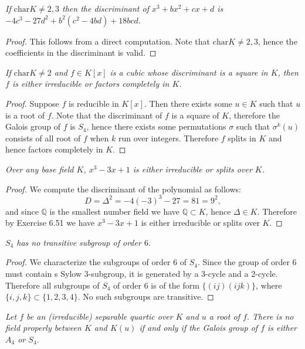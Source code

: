 \begin{problem}\em
If $\mathrm{char }K\neq 2, 3$ then the discriminant of $x^3+bx^2+cx+d$ is $-4c^3-27d^2+b^2(c^2-4bd)+18bcd$.
\end{problem}
\begin{proof}
This follows from a direct computation. Note that $\mathrm{char}K\ne 2,3$, hence the coefficients in the discriminant is valid.
\end{proof}
\begin{problem}\em
If $\mathrm{char }K\neq 2$ and $f\in K[x]$ is a cubic whose discriminant is a square in $K$, then $f$ is either irreducible or factors completely in $K$.
\end{problem}
\begin{proof}
Suppose $f$ is reducible in $K[x]$. Then there exists some $u\in K$ such that $u$ is a root of $f$. Note that the discriminant of $f$ is a square of $K$, therefore the Galois group of $f$ is $S_4$, hence there exists some permutations $\sigma$ such that $\sigma^k(u)$ consists of all root of $f$ when $k$ run over integers. Therefore $f$ splits in $K$ and hence factors completely in $K$.
\end{proof}
\begin{problem}\em
Over any base field $K$, $x^3-3x+1$ is either irreducible or splits over $K$.
\end{problem}
\begin{proof}
We compute the discriminant of the polynomial as follows: 
$$
D=\Delta ^2=-4\left( -3 \right) ^3-27=81=9^2,
$$
and since $\mathbb{Q}$ is the smallest number field we have $\mathbb{Q}\subset K$, hence $\Delta\in K$. Therefore by Exercise 6.51 we have $x^3-3x+1$ is either irreducible or splits over $K$.
\end{proof}
\begin{problem}\em
$S_4$ has no transitive subgroup of order $6$.
\end{problem}
\begin{proof}
We characterize the subgroups of order $6$ of $S_4$. Since the group of order $6$ must contain s Sylow $3$-subgroup, it is generated by a $3$-cycle and a $2$-cycle. Therefore all subgroups of $S_4$ of order $6$ is of the form $\{(ij)(ijk)\}$, where $\{i,j,k\}\subset\{1,2,3,4\}$. No such subgroups are transitive.
\end{proof}
\begin{problem}\em
Let $f$ be an (irreducible) separable quartic over $K$ and $u$ a root of $f$. There is no field properly between $K$ and $K(u)$ if and only if the Galois group of $f$ is either $A_4$ or $S_4$.
\end{problem}
